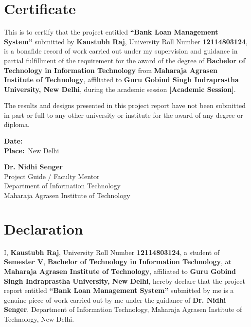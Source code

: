 \documentclass[12pt,a4paper,oneside]{report}
\begin{document}
\newpage
\chapter*{Certificate}
\thispagestyle{empty}

This is to certify that the project entitled \textbf{``Bank Loan Management System''} submitted by \textbf{Kaustubh Raj}, University Roll Number \textbf{12114803124}, is a bonafide record of work carried out under my supervision and guidance in partial fulfillment of the requirement for the award of the degree of \textbf{Bachelor of Technology in Information Technology} from \textbf{Maharaja Agrasen Institute of Technology}, affiliated to \textbf{Guru Gobind Singh Indraprastha University, New Delhi}, during the academic session \textbf{[Academic Session]}.

The results and designs presented in this project report have not been submitted in part or full to any other university or institute for the award of any degree or diploma.

\vspace{2.5cm}

\noindent
\begin{minipage}{0.45\textwidth}
    \textbf{Date:}\ \hrulefill\\[0.5cm]
    \textbf{Place:}\ New Delhi
\end{minipage}
\hfill
\begin{minipage}{0.45\textwidth}
    \begin{flushright}
        \textbf{Dr. Nidhi Senger}\\
        Project Guide / Faculty Mentor\\
        Department of Information Technology\\
        Maharaja Agrasen Institute of Technology
    \end{flushright}
\end{minipage}

\newpage
\chapter*{Declaration}
\thispagestyle{empty}

I, \textbf{Kaustubh Raj}, University Roll Number \textbf{12114803124}, a student of \textbf{Semester V}, \textbf{Bachelor of Technology in Information Technology}, at \textbf{Maharaja Agrasen Institute of Technology}, affiliated to \textbf{Guru Gobind Singh Indraprastha University, New Delhi}, hereby declare that the project report entitled \textbf{``Bank Loan Management System''} submitted by me is a genuine piece of work carried out by me under the guidance of \textbf{Dr. Nidhi Senger}, Department of Information Technology, Maharaja Agrasen Institute of Technology, New Delhi.
\end{document}
